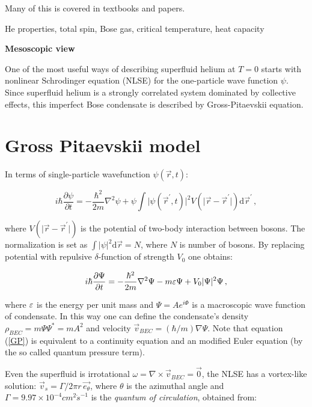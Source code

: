 Many of this is covered in textbooks and papers.

He properties, total spin, Bose gas, critical temperature, heat capacity

\newpage

{\Huge \bfseries Mesoscopic view}
\vspace{0.3cm}

One of the most useful ways of describing superfluid helium at $T=0$ starts with nonlinear Schrodinger equation (NLSE) for the one-particle wave function $\psi$. Since superfluid helium is a strongly correlated system dominated by collective effects, this imperfect Bose condensate is described by Gross-Pitaevskii equation.

\section{Gross Pitaevskii model}

In terms of single-particle wavefunction $\psi(\vec{r},t)$:

\begin{equation}
i \hbar \frac{\partial \psi}{\partial t} = - \frac{\hbar^2}{2m} \nabla^2 \psi
+ \psi \int \vert \psi(\vec{r}^{\prime},t) \vert^2 V(\vert \vec{r} - \vec{r}^{\prime} \vert)
\text{d}\vec{r}^{\prime}\,,
\end{equation}

where $V(\vert \vec{r} - \vec{r}^{\prime} \vert)$ is the potential of two-body interaction between bosons. The normalization is set as $\int \vert \psi \vert^2 \text{d}\vec{r} = N$, where $N$ is number of bosons. By replacing potential with repulsive $\delta$-function of strength $V_0$ one obtains:

\begin{equation}
i \hbar \frac{\partial \Psi}{\partial t} = - \frac{\hbar^2}{2m} \nabla^2 \Psi - m\varepsilon \Psi + V_0 \vert \Psi \vert^2 \Psi\,,
\label{GP}
\end{equation}

where $\varepsilon$ is the energy per unit mass and $\Psi = A e^{i\Phi}$ is a macroscopic wave function of condensate. In this way one can define the condensate's density $\rho_{BEC} = m\Psi\Psi^* =  mA^2$ and velocity $\vec{v}_{BEC} = (\hbar / m)\nabla \Psi$. Note that equation (\ref{GP}) is equivalent to a continuity equation and an modified Euler equation (by the so called quantum pressure term).

Even the superfluid is irrotational $\omega = \nabla \times \vec{v}_{BEC} = \vec{0}$, the NLSE has a vortex-like solution: $\vec{v}_s = \Gamma / 2\pi r\, \vec{e_{\theta}}$, where $\theta$ is the azimuthal angle and $\Gamma=9.97 \times 10^{-4} \unit{cm^2 \dot s^{-1}}$ is the \textit{quantum of circulation}, obtained from:

